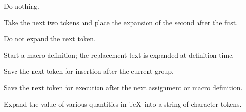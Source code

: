 \documentclass[letterpaper]{book}
\begin{document}
\label{cschap:relax}\label{cschap:expandafter}\label{cschap:noexpand}\label{cschap:afterassignment}\label{cschap:the}
\begin{inventory}
\item [\cs{relax}] 
     Do nothing.


\item [\cs{expandafter}]  
      Take the next two tokens and place the expansion of the
      second after the first.

\item [\cs{noexpand}]   
      Do not expand the next token.


\item [\cs{edef}] 
      Start a macro definition; 
      the replacement text is expanded at definition time.

% 
 
\item [\cs{aftergroup}]  
      Save the next token for insertion after the current group.

\item [\cs{afterassignment}]   
      Save the next token for execution after the next assignment
      or macro definition.


\item [\cs{the}] 
      Expand the value of various quantities in \TeX\ into a string
      of character tokens.

\end{inventory}
\end{document}
